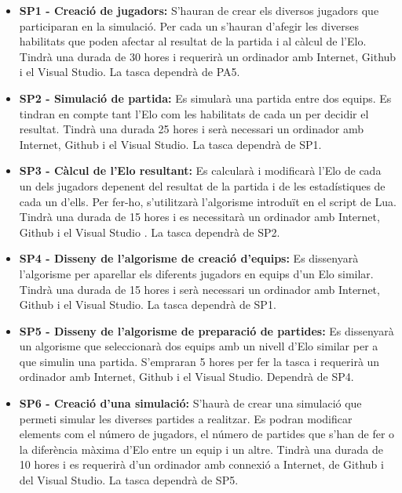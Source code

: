 \documentclass[a4paper]{article}
\newcounter{subsubsubsection}[subsubsection]
\begin{document}
\begin{itemize}
    \item \textbf{SP1 - Creació de jugadors:} S'hauran de crear els diversos jugadors que participaran en la simulació. Per cada un s'hauran d'afegir les diverses habilitats que poden afectar al resultat de la partida i al càlcul de l'Elo. Tindrà una durada de 30 hores i requerirà un ordinador amb Internet, Github i el Visual Studio. La tasca dependrà de PA5.
    \item \textbf{SP2 - Simulació de partida:} Es simularà una partida entre dos equips. Es tindran en compte tant l'Elo com les habilitats de cada un per decidir el resultat. Tindrà una durada 25 hores i serà necessari un ordinador amb Internet, Github i el Visual Studio. La tasca dependrà de SP1.
    \item \textbf{SP3 - Càlcul de l'Elo resultant:} Es calcularà i modificarà l'Elo de cada un dels jugadors depenent del resultat de la partida i de les estadístiques de cada un d'ells. Per fer-ho, s'utilitzarà l'algorisme introduït en el script de Lua. Tindrà una durada de 15 hores i es necessitarà un ordinador amb Internet, Github i el Visual Studio . La tasca dependrà de SP2.
    \item \textbf{SP4 - Disseny de l'algorisme de creació d'equips:} Es dissenyarà l'algorisme per aparellar els diferents jugadors en equips d'un Elo similar. Tindrà una durada de 15 hores i serà necessari un ordinador amb Internet, Github i el Visual Studio. La tasca dependrà de SP1.
    \item \textbf{SP5 - Disseny de l'algorisme de preparació de partides:} Es dissenyarà un algorisme que seleccionarà dos equips amb un nivell d'Elo similar per a que simulin una partida. S'empraran 5 hores per fer la tasca i requerirà un ordinador amb Internet, Github i el Visual Studio. Dependrà de SP4.
    \item \textbf{SP6 - Creació d'una simulació:} S'haurà de crear una simulació que permeti simular les diverses partides a realitzar. Es podran modificar elements com el número de jugadors, el número de partides que s'han de fer o la diferència màxima d'Elo entre un equip i un altre. Tindrà una durada de 10 hores i es requerirà d'un ordinador amb connexió a Internet, de Github i del Visual Studio. La tasca dependrà de SP5. 
\end{itemize}
\end{document}
